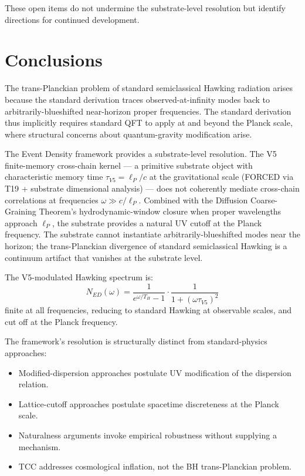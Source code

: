 \documentclass[11pt,a4paper]{article}
\begin{document}
These open items do not undermine the substrate-level resolution but identify directions for continued development.

\section{Conclusions}

The trans-Planckian problem of standard semiclassical Hawking radiation arises because the standard derivation traces observed-at-infinity modes back to arbitrarily-blueshifted near-horizon proper frequencies. The standard derivation thus implicitly requires standard QFT to apply at and beyond the Planck scale, where structural concerns about quantum-gravity modification arise.

The Event Density framework provides a substrate-level resolution. The V5 finite-memory cross-chain kernel --- a primitive substrate object with characteristic memory time $\tau_{V5} = \ell_P/c$ at the gravitational scale (FORCED via T19 + substrate dimensional analysis) --- does not coherently mediate cross-chain correlations at frequencies $\omega \gg c/\ell_P$. Combined with the Diffusion Coarse-Graining Theorem's hydrodynamic-window closure when proper wavelengths approach $\ell_P$, the substrate provides a natural UV cutoff at the Planck frequency. The substrate cannot instantiate arbitrarily-blueshifted modes near the horizon; the trans-Planckian divergence of standard semiclassical Hawking is a continuum artifact that vanishes at the substrate level.

The V5-modulated Hawking spectrum is:
\[
N_{ED}(\omega) = \frac{1}{e^{\omega/T_H} - 1} \cdot \frac{1}{1 + (\omega\tau_{V5})^{2}}
\]
finite at all frequencies, reducing to standard Hawking at observable scales, and cut off at the Planck frequency.

The framework's resolution is structurally distinct from standard-physics approaches:
\begin{itemize}[noitemsep]
\item Modified-dispersion approaches postulate UV modification of the dispersion relation.
\item Lattice-cutoff approaches postulate spacetime discreteness at the Planck scale.
\item Naturalness arguments invoke empirical robustness without supplying a mechanism.
\item TCC addresses cosmological inflation, not the BH trans-Planckian problem.
\end{itemize}
\end{document}
